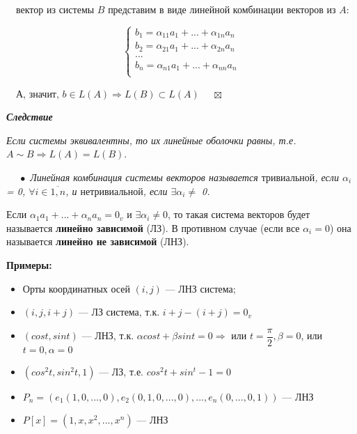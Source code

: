 \documentclass[a4paper, 12pt]{report}
\begin{document}
	$\quad$вектор из системы $B$ представим в виде линейной комбинации векторов из $A$:
	\begin{center}
		\begin{equation*}
			\begin{cases}
				b_1 = \alpha_{11}a_1 + ... + \alpha_{1n}a_n
				\\
				b_2 = \alpha_{21}a_1 + ... + \alpha_{2n}a_n
				\\
				...
				\\
				b_n = \alpha_{n1}a_1 + ... + \alpha_{nn}a_n
				\\
			\end{cases}
		\end{equation*}
	\end{center}
	\par\bigskip
	$\quad$А, значит, $b \in L(A) \Rightarrow L(B) \subset L(A)$ $\quad\boxtimes$
	\par\bigskip
	\textbf{\textit{Следствие}}
	
	\textit{Если системы эквивалентны, то их линейные оболочки равны, т.е. $A \sim B \Rightarrow L(A) = L(B)$}.
	\par\bigskip
	$\quad\; \bullet$ \textit{Линейная комбинация системы векторов называется $\textbf{тривиальной}$, если $\alpha_i$ = 0, $\forall i \in \overline{1, n}$, и $\textbf{нетривиальной}$, если $\exists \alpha_i \ne$ 0.}
	\par\bigskip
	Если $\alpha_1a_1 + ... + \alpha_n a_n = 0_v$ и $\exists \alpha_i \ne 0$, то такая система векторов будет называется \textbf{линейно зависимой} (ЛЗ). В противном случае (если все $\alpha_i = 0$) она называется \textbf{линейно не зависимой} (ЛНЗ).
	\par\bigskip
	\textbf{Примеры:}
	\begin{itemize}
		\item Орты координатных осей $(i, j)$ --- ЛНЗ система;
		\item $(i, j, i + j)$ --- ЛЗ система, т.к. $i + j - (i + j) = 0_v$
		\item $(cost, sint)$ --- ЛНЗ, т.к. $\alpha cost + \beta sint = 0 \Rightarrow$ или $t = \dfrac{\pi}{2}, \beta = 0$, или $t = 0, \alpha = 0$
		\item $(cos^2t, sin^2t, 1)$ --- ЛЗ, т.е. $cos^2t + sin^t - 1 = 0$
		\item $P_n = (e_1(1, 0, ..., 0), e_2(0, 1, 0, ..., 0), ..., e_n(0, ..., 0, 1))$ --- ЛНЗ
		\item $P[x] = (1, x, x^2, ..., x^n)$ --- ЛНЗ
	\end{itemize}
	
\end{document}
